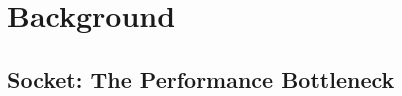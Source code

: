 \section{Background}
\label{sec:background}

\subsection{Socket: The Performance Bottleneck}
\label{subsec:motivation}






